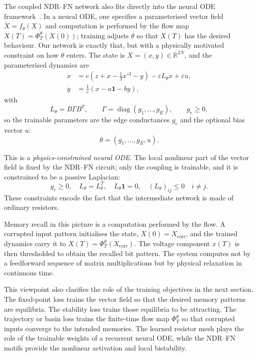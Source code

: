 \documentclass[11pt]{article}
\begin{document}
The coupled NDR--FN network also fits directly into the neural ODE
framework~\cite{chen2018neuralode}. In a neural ODE, one specifies a
parameterised vector field $\dot X = f_\theta(X)$ and computation is
performed by the flow map $X(T) = \Phi_T^\theta(X(0))$; training
adjusts $\theta$ so that $X(T)$ has the desired behaviour. Our network
is exactly that, but with a physically motivated constraint on how
$\theta$ enters. The state is $X = (x,y) \in \mathbb{R}^{2N}$, and the
parameterised dynamics are
\begin{align}
  \dot{x}
  &=
  c\!\left(z+x-\frac{1}{3}x^{\circ 3}-y\right)
  -
  \varepsilon L_\theta x
  +
  \varepsilon u,
  \label{eq:neural_ode_x}\\
  \dot{y}
  &=
  \frac{1}{c}(x-a\mathbf{1}-by),
  \label{eq:neural_ode_y}
\end{align}
with
\begin{equation}
  L_\theta = B\Gamma B^T,
  \qquad
  \Gamma=\operatorname{diag}(g_1,\ldots,g_E),
  \qquad
  g_e\geq 0,
  \label{eq:neural_ode_laplacian}
\end{equation}
so the trainable parameters are the edge conductances $g_e$ and the
optional bias vector $u$:
\begin{equation}
  \theta=(g_1,\ldots,g_E,u).
  \label{eq:theta_conductances}
\end{equation}

This is a \emph{physics-constrained neural ODE}. The local nonlinear
part of the vector field is fixed by the NDR--FN circuit; only the
coupling is trainable, and it is constrained to be a passive Laplacian:
\begin{equation}
  g_e\geq 0,
  \quad
  L_\theta=L_\theta^T,
  \quad
  L_\theta\mathbf{1}=0,
  \quad
  (L_\theta)_{ij}\leq 0\quad i\neq j.
  \label{eq:physical_neural_ode_constraints}
\end{equation}
These constraints encode the fact that the intermediate network is made
of ordinary resistors.

Memory recall in this picture is a computation performed by the flow. A
corrupted input pattern initialises the state, $X(0) = X_{\mathrm{corr}}$,
and the trained dynamics carry it to $X(T) = \Phi_T^\theta(X_{\mathrm{corr}})$.
The voltage component $x(T)$ is then thresholded to obtain the recalled
bit pattern. The system computes not by a feedforward sequence of matrix
multiplications but by physical relaxation in continuous time.

This viewpoint also clarifies the role of the training objectives in the
next section. The fixed-point loss trains the vector field so that the
desired memory patterns are equilibria. The stability loss trains those
equilibria to be attracting. The trajectory or basin loss trains the
finite-time flow map $\Phi_T^\theta$ so that corrupted inputs converge
to the intended memories. The learned resistor mesh plays the role of
the trainable weights of a recurrent neural ODE, while the NDR--FN
motifs provide the nonlinear activation and local bistability.
\end{document}
